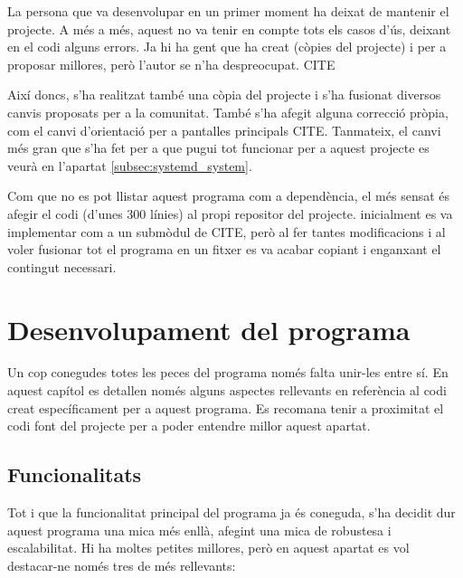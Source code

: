 La persona que va desenvolupar  en un primer moment ha deixat de
mantenir el projecte. A més a més, aquest no va tenir en compte tots els casos
d'ús, deixant en el codi alguns errors. Ja hi ha gent que ha creat 
(còpies del projecte) i  per a proposar millores, però
l'autor se n'ha despreocupat. CITE

Així doncs, s'ha realitzat també una còpia del projecte i s'ha fusionat diversos
canvis proposats per a la comunitat. També s'ha afegit alguna correcció pròpia,
com el canvi d'orientació per a pantalles principals CITE. Tanmateix, el canvi més
gran que s'ha fet per a que pugui tot funcionar per a aquest projecte es veurà
en l'apartat \ref{subsec:systemd_system}.

Com que no es pot llistar aquest programa com a dependència, el més sensat és
afegir el codi (d'unes 300 línies) al propi repositor del projecte. inicialment
es va implementar com a un submòdul de  CITE, però al fer tantes
modificacions i al voler fusionar tot el programa en un fitxer es va acabar
copiant i enganxant el contingut necessari.

\section{Desenvolupament del programa}

Un cop conegudes totes les peces del programa només falta unir-les entre sí. En
aquest capítol es detallen només alguns aspectes rellevants en referència al codi
creat específicament per a aquest programa. Es recomana tenir a proximitat el
codi font del projecte per a poder entendre millor aquest apartat.

\subsection{Funcionalitats}

Tot i que la funcionalitat principal del programa ja és coneguda, s'ha decidit
dur aquest programa una mica més enllà, afegint una mica de robustesa i
escalabilitat. Hi ha moltes petites millores, però en aquest apartat es vol
destacar-ne només tres de més rellevants:

